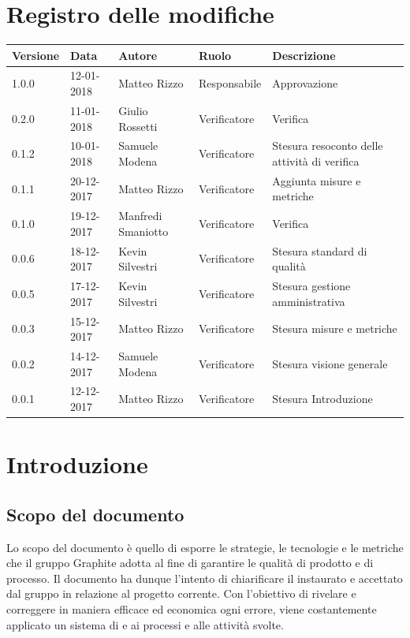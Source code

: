 \documentclass[openany,12pt,a4paper]{report}
\begin{document}
\chapter*{Registro delle modifiche}
\setlength\LTleft{-22mm}
\begin{longtable}{|p{20mm}|p{20mm}|p{40mm}|p{30mm}|p{50mm}|}
	\hline
	\textbf{Versione} & \textbf{Data} & \textbf{Autore} & \textbf{Ruolo} & \textbf{Descrizione} \\

		\hline 1.0.0 & 12-01-2018 & Matteo Rizzo & Responsabile & Approvazione \\
		\hline 0.2.0 & 11-01-2018 & Giulio Rossetti & Verificatore & Verifica \\
		\hline 0.1.2 & 10-01-2018 & Samuele Modena & Verificatore & Stesura resoconto delle attività di verifica \\
		\hline 0.1.1 & 20-12-2017 & Matteo Rizzo & Verificatore & Aggiunta misure e metriche \\
		\hline 0.1.0 & 19-12-2017 & Manfredi Smaniotto & Verificatore & Verifica \\		
		\hline 0.0.6 & 18-12-2017 & Kevin Silvestri & Verificatore & Stesura standard di qualità \\
		\hline 0.0.5 & 17-12-2017 & Kevin Silvestri & Verificatore & Stesura gestione amministrativa \\	
		\hline 0.0.3 & 15-12-2017 & Matteo Rizzo & Verificatore & Stesura misure e metriche \\
		\hline 0.0.2 & 14-12-2017 & Samuele Modena & Verificatore & Stesura visione generale \\
		\hline 0.0.1 & 12-12-2017 & Matteo Rizzo & Verificatore & Stesura Introduzione \\
		\hline
		
	\end{longtable}


\tableofcontents


\chapter{Introduzione}

    \section{Scopo del documento}
    
    Lo scopo del documento è quello di esporre le strategie, le tecnologie e le metriche che il gruppo Graphite adotta al fine di garantire le qualità di prodotto e di processo. Il documento ha dunque l'intento di chiarificare il  instaurato e accettato dal gruppo in relazione al progetto corrente. Con l'obiettivo di rivelare e correggere in maniera efficace ed economica ogni errore, viene costantemente applicato un sistema di  e  ai processi e alle attività svolte.
    
\end{document}

